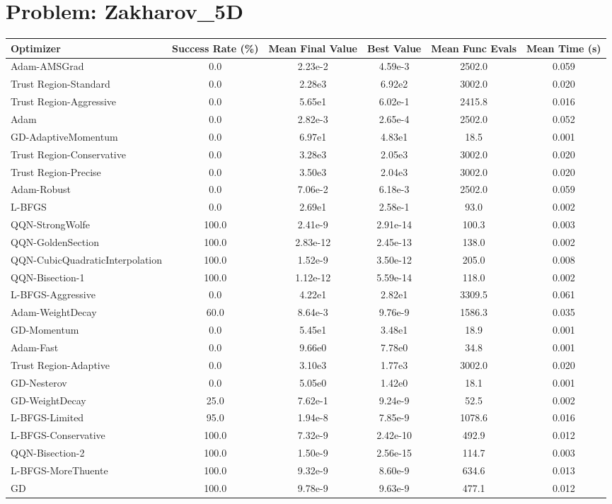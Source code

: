 \documentclass{article}
\begin{document}
\section{Problem: Zakharov\_5D}
\begin{longtable}{p{3cm}*{5}{c}}
\toprule
\textbf{Optimizer} & \textbf{Success Rate (\%)} & \textbf{Mean Final Value} & \textbf{Best Value} & \textbf{Mean Func Evals} & \textbf{Mean Time (s)} \\
\midrule
Adam-AMSGrad & 0.0 & 2.23e-2 & 4.59e-3 & 2502.0 & 0.059 \\
Trust Region-Standard & 0.0 & 2.28e3 & 6.92e2 & 3002.0 & 0.020 \\
Trust Region-Aggressive & 0.0 & 5.65e1 & 6.02e-1 & 2415.8 & 0.016 \\
Adam & 0.0 & 2.82e-3 & 2.65e-4 & 2502.0 & 0.052 \\
GD-AdaptiveMomentum & 0.0 & 6.97e1 & 4.83e1 & 18.5 & 0.001 \\
Trust Region-Conservative & 0.0 & 3.28e3 & 2.05e3 & 3002.0 & 0.020 \\
Trust Region-Precise & 0.0 & 3.50e3 & 2.04e3 & 3002.0 & 0.020 \\
Adam-Robust & 0.0 & 7.06e-2 & 6.18e-3 & 2502.0 & 0.059 \\
L-BFGS & 0.0 & 2.69e1 & 2.58e-1 & 93.0 & 0.002 \\
QQN-StrongWolfe & 100.0 & 2.41e-9 & 2.91e-14 & 100.3 & 0.003 \\
QQN-GoldenSection & 100.0 & 2.83e-12 & 2.45e-13 & 138.0 & 0.002 \\
QQN-CubicQuadraticInterpolation & 100.0 & 1.52e-9 & 3.50e-12 & 205.0 & 0.008 \\
QQN-Bisection-1 & 100.0 & 1.12e-12 & 5.59e-14 & 118.0 & 0.002 \\
L-BFGS-Aggressive & 0.0 & 4.22e1 & 2.82e1 & 3309.5 & 0.061 \\
Adam-WeightDecay & 60.0 & 8.64e-3 & 9.76e-9 & 1586.3 & 0.035 \\
GD-Momentum & 0.0 & 5.45e1 & 3.48e1 & 18.9 & 0.001 \\
Adam-Fast & 0.0 & 9.66e0 & 7.78e0 & 34.8 & 0.001 \\
Trust Region-Adaptive & 0.0 & 3.10e3 & 1.77e3 & 3002.0 & 0.020 \\
GD-Nesterov & 0.0 & 5.05e0 & 1.42e0 & 18.1 & 0.001 \\
GD-WeightDecay & 25.0 & 7.62e-1 & 9.24e-9 & 52.5 & 0.002 \\
L-BFGS-Limited & 95.0 & 1.94e-8 & 7.85e-9 & 1078.6 & 0.016 \\
L-BFGS-Conservative & 100.0 & 7.32e-9 & 2.42e-10 & 492.9 & 0.012 \\
QQN-Bisection-2 & 100.0 & 1.50e-9 & 2.56e-15 & 114.7 & 0.003 \\
L-BFGS-MoreThuente & 100.0 & 9.32e-9 & 8.60e-9 & 634.6 & 0.013 \\
GD & 100.0 & 9.78e-9 & 9.63e-9 & 477.1 & 0.012 \\
\bottomrule
\end{longtable}
\end{document}
